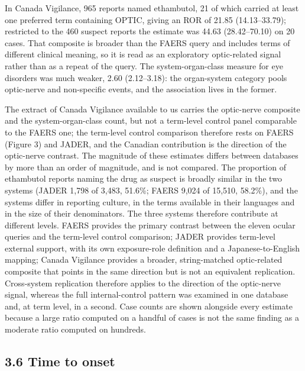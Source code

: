 \documentclass[12pt,a4paper]{article}
\begin{document}
In Canada Vigilance, 965 reports named ethambutol, 21 of which carried at least one preferred term containing OPTIC, giving an ROR of 21.85 (14.13–33.79); restricted to the 460 suspect reports the estimate was 44.63 (28.42–70.10) on 20 cases. That composite is broader than the FAERS query and includes terms of different clinical meaning, so it is read as an exploratory optic-related signal rather than as a repeat of the query. The system-organ-class measure for eye disorders was much weaker, 2.60 (2.12–3.18): the organ-system category pools optic-nerve and non-specific events, and the association lives in the former.

The extract of Canada Vigilance available to us carries the optic-nerve composite and the system-organ-class count, but not a term-level control panel comparable to the FAERS one; the term-level control comparison therefore rests on FAERS (Figure 3) and JADER, and the Canadian contribution is the direction of the optic-nerve contrast. The magnitude of these estimates differs between databases by more than an order of magnitude, and is not compared. The proportion of ethambutol reports naming the drug as suspect is broadly similar in the two systems (JADER 1,798 of 3,483, 51.6\%; FAERS 9,024 of 15,510, 58.2\%), and the systems differ in reporting culture, in the terms available in their languages and in the size of their denominators. The three systems therefore contribute at different levels. FAERS provides the primary contrast between the eleven ocular queries and the term-level control comparison; JADER provides term-level external support, with its own exposure-role definition and a Japanese-to-English mapping; Canada Vigilance provides a broader, string-matched optic-related composite that points in the same direction but is not an equivalent replication. Cross-system replication therefore applies to the direction of the optic-nerve signal, whereas the full internal-control pattern was examined in one database and, at term level, in a second. Case counts are shown alongside every estimate because a large ratio computed on a handful of cases is not the same finding as a moderate ratio computed on hundreds.

\subsection*{3.6 Time to onset}
\end{document}
